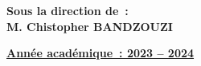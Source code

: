 \begin{titlepage}
  \vspace{0.2cm}
  \begin{flushright}
    \large {
      \textbf {
        Sous la direction de : \\
        M. Chistopher BANDZOUZI
      }
    }
  \end{flushright}

  \vspace{1.5cm}
  \begin{center}
    \large {
      \textbf { \underline {Année académique : 2023 – 2024} }
    }
  \end{center}


\end{titlepage}
